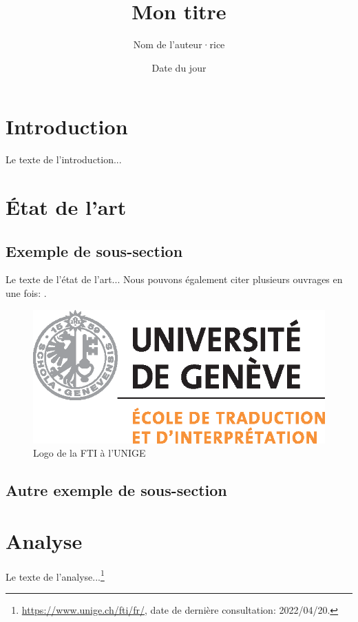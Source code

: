 \documentclass[a4paper,12pt]{article} %
\title{Mon titre} %
\author{Nom de l'auteur·rice} %
\date{Date du jour} %
\begin{document}
\maketitle %

\section{Introduction} %
Le texte de l'introduction... \cite{van2016introduction} %

\section{État de l'art} %
\subsection{Exemple de sous-section}
Le texte de l'état de l'art... \cite[p. 123]{tahmasebi2019strengths} %
Nous pouvons également citer plusieurs ouvrages en une fois: \cite{hill2019quantifying,verborgh2013using,de2017semantic}.

\begin{figure}[h] %
  \centering %
  \includegraphics[scale=1]{unige-FTI} %
  \caption{Logo de la FTI à l'UNIGE} %
\end{figure}

\subsection{Autre exemple de sous-section}

\section{Analyse} %
Le texte de l'analyse...\footnote{\url{https://www.unige.ch/fti/fr/}, date de dernière consultation: 2022/04/20.} %
\end{document}
